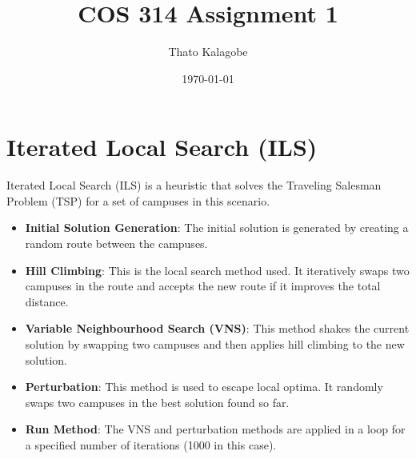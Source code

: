 \documentclass{article}
\begin{document}
\title{COS 314 Assignment 1}
\author{Thato Kalagobe}
\date{\today}
\maketitle

\section{Iterated Local Search (ILS)}
Iterated Local Search (ILS) is a heuristic that solves the Traveling Salesman Problem (TSP) for a set of campuses in this scenario.
\begin{itemize}
    \item \textbf{Initial Solution Generation}: The initial solution is generated by creating a random route between the campuses.
    \item \textbf{Hill Climbing}: This is the local search method used. It iteratively swaps two campuses in the route and accepts the new route if it improves the total distance.
    \item \textbf{Variable Neighbourhood Search (VNS)}: This method shakes the current solution by swapping two campuses and then applies hill climbing to the new solution.
    \item \textbf{Perturbation}: This method is used to escape local optima. It randomly swaps two campuses in the best solution found so far.
    \item \textbf{Run Method}: The VNS and perturbation methods are applied in a loop for a specified number of iterations (1000 in this case).
\end{itemize}
\end{document}
